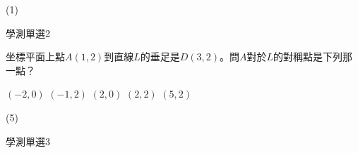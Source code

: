 \begin{QUESTIONS}
\begin{QUESTION}
\begin{QBODY}
        \end{QBODY}
        \begin{QFROMS}
        \end{QFROMS}
        \begin{QTAGS}\end{QTAGS}
        \begin{QANS}
            (1)
        \end{QANS}
        \begin{QSOLLIST}
        \end{QSOLLIST}
        \begin{QEMPTYSPACE}
        \end{QEMPTYSPACE}
    \end{QUESTION}
    \begin{QUESTION}
        \begin{ExamInfo}{85}{學測}{單選}{2}
        \end{ExamInfo}
        \begin{ExamAnsRateInfo}{}{}{}{}
        \end{ExamAnsRateInfo}
        \begin{QBODY}
            坐標平面上點$A \left( 1,2 \right)$到直線$L$的垂足是$D \left( 3,2 \right)$。問$ A $對於$L$的對稱點是下列那一點？
            \begin{QOPS} 
            \QOP $\left( -2,0 \right)$	
            \QOP $\left( -1,2 \right)$
            \QOP $\left( 2,0 \right)$
            \QOP $\left( 2,2 \right)$	
            \QOP $\left( 5,2 \right)$
            \end{QOPS}            
        \end{QBODY}
        \begin{QFROMS}
        \end{QFROMS}
        \begin{QTAGS}\end{QTAGS}
        \begin{QANS}
            (5)
        \end{QANS}
        \begin{QSOLLIST}
        \end{QSOLLIST}
        \begin{QEMPTYSPACE}
        \end{QEMPTYSPACE}
    \end{QUESTION}
    \begin{QUESTION}
        \begin{ExamInfo}{85}{學測}{單選}{3}
        \end{ExamInfo}
        \begin{ExamAnsRateInfo}{}{}{}{}

\end{ExamAnsRateInfo}
\end{QUESTION}
\end{QUESTIONS}
